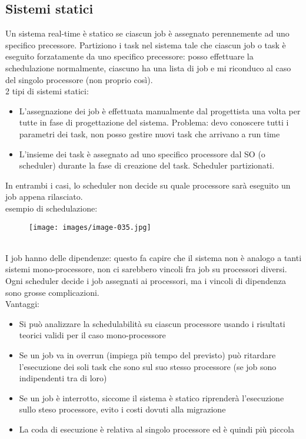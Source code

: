 \documentclass[12pt, oneside]{extbook}
\begin{document}
\subsection{Sistemi statici}
Un sistema real-time è statico se ciascun job è assegnato perennemente ad uno specifico precessore. Partiziono i task nel sistema tale che ciascun job o task è eseguito forzatamente da uno specifico precessore: posso effettuare la schedulazione normalmente, ciascuno ha una lista di job e mi riconduco al caso del singolo processore (non proprio così).\\ 2 tipi di sistemi statici:
\begin{itemize}
\item L'assegnazione dei job è effettuata manualmente dal progettista una volta per tutte in fase di progettazione del sistema. Problema: devo conoscere tutti i parametri dei task, non posso gestire nuovi task che arrivano a run time
\item L'insieme dei task è assegnato ad uno specifico processore dal SO (o scheduler) durante la fase di creazione del task. Scheduler partizionati.
\end{itemize}
In entrambi i casi, lo scheduler non decide su quale processore sarà eseguito un job appena rilasciato.\\ esempio di schedulazione:\\
\begin{figure}[!h]
\centering
\texttt{[image: images/image-035.jpg]}
\end{figure}
\\I job hanno delle dipendenze: questo fa capire che il sistema non è analogo a tanti sistemi mono-processore, non ci sarebbero vincoli fra job su processori diversi. Ogni scheduler decide i job assegnati ai processori, ma i vincoli di dipendenza sono grosse complicazioni.\\ Vantaggi:
\begin{itemize}
\item Si può analizzare la schedulabilità su  ciascun processore usando i risultati teorici validi per il caso mono-processore
\item Se un job va in overrun (impiega più tempo del previsto) può ritardare l'esecuzione dei soli task che sono sul suo stesso processore (se job sono indipendenti tra di loro)
\item Se un job è interrotto, siccome il sistema è statico riprenderà l'esecuzione sullo steso processore, evito i costi dovuti alla migrazione
\item La coda di esecuzione è relativa al singolo processore ed è quindi più piccola
\end{itemize}
\end{document}
